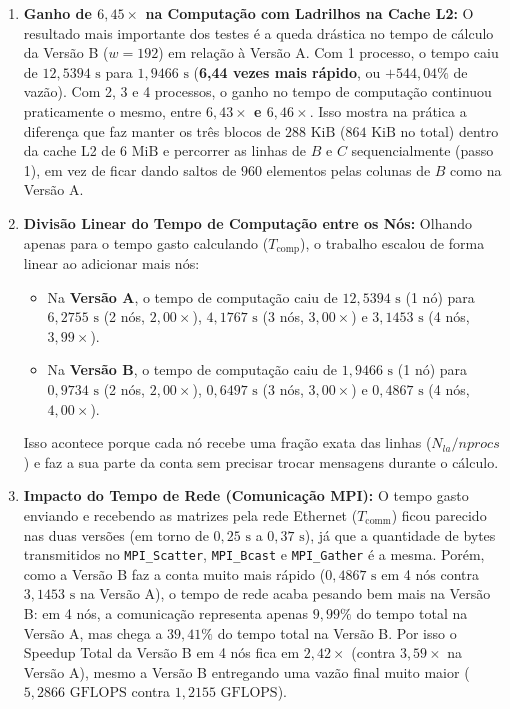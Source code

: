 \documentclass[12pt, a4paper, twoside, chapter=TITLE, subsection=TITLE, section=TITLE, subsubsection=TITLE, english, brazil]{abntex2}
\begin{document}
\begin{enumerate}
    \item \textbf{Ganho de $6,45\times$ na Computação com Ladrilhos na Cache L2:} O resultado mais importante dos testes é a queda drástica no tempo de cálculo da Versão B ($w = 192$) em relação à Versão A. Com 1 processo, o tempo caiu de $12,5394\text{ s}$ para $1,9466\text{ s}$ (\textbf{6,44 vezes mais rápido}, ou $+544,04\%$ de vazão). Com 2, 3 e 4 processos, o ganho no tempo de computação continuou praticamente o mesmo, entre \textbf{$6,43\times$ e $6,46\times$}. Isso mostra na prática a diferença que faz manter os três blocos de $288\text{ KiB}$ ($864\text{ KiB}$ no total) dentro da cache L2 de $6\text{ MiB}$ e percorrer as linhas de $B$ e $C$ sequencialmente (passo 1), em vez de ficar dando saltos de $960$ elementos pelas colunas de $B$ como na Versão A.

    \item \textbf{Divisão Linear do Tempo de Computação entre os Nós:} Olhando apenas para o tempo gasto calculando ($T_{\text{comp}}$), o trabalho escalou de forma linear ao adicionar mais nós:
    \begin{itemize}
        \item Na \textbf{Versão A}, o tempo de computação caiu de $12,5394\text{ s}$ (1 nó) para $6,2755\text{ s}$ (2 nós, $2,00\times$), $4,1767\text{ s}$ (3 nós, $3,00\times$) e $3,1453\text{ s}$ (4 nós, \textbf{$3,99\times$}).
        \item Na \textbf{Versão B}, o tempo de computação caiu de $1,9466\text{ s}$ (1 nó) para $0,9734\text{ s}$ (2 nós, $2,00\times$), $0,6497\text{ s}$ (3 nós, $3,00\times$) e $0,4867\text{ s}$ (4 nós, \textbf{$4,00\times$}).
    \end{itemize}
    Isso acontece porque cada nó recebe uma fração exata das linhas ($N_{la}/nprocs$) e faz a sua parte da conta sem precisar trocar mensagens durante o cálculo.

    \item \textbf{Impacto do Tempo de Rede (Comunicação MPI):} O tempo gasto enviando e recebendo as matrizes pela rede Ethernet ($T_{\text{comm}}$) ficou parecido nas duas versões (em torno de $0,25\text{ s}$ a $0,37\text{ s}$), já que a quantidade de bytes transmitidos no \nolinkurl{MPI_Scatter}, \nolinkurl{MPI_Bcast} e \nolinkurl{MPI_Gather} é a mesma. Porém, como a Versão B faz a conta muito mais rápido ($0,4867\text{ s}$ em 4 nós contra $3,1453\text{ s}$ na Versão A), o tempo de rede acaba pesando bem mais na Versão B: em 4 nós, a comunicação representa apenas \textbf{$9,99\%$} do tempo total na Versão A, mas chega a \textbf{$39,41\%$} do tempo total na Versão B. Por isso o Speedup Total da Versão B em 4 nós fica em $2,42\times$ (contra $3,59\times$ na Versão A), mesmo a Versão B entregando uma vazão final muito maior ($5,2866\text{ GFLOPS}$ contra $1,2155\text{ GFLOPS}$).
\end{enumerate}
\end{document}
